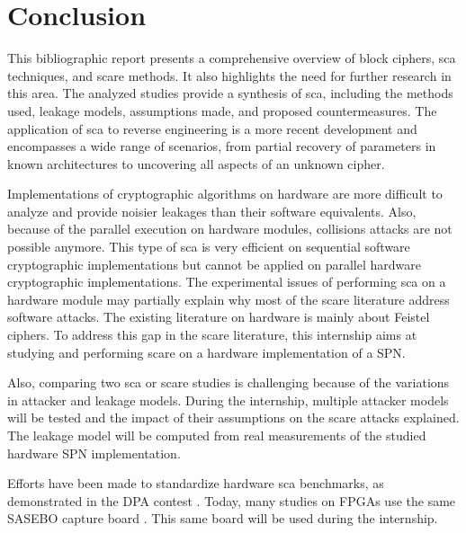 \documentclass[11pt]{sdm}
\begin{document}



\section{Conclusion}

This bibliographic report presents a comprehensive overview of block ciphers, \gls{sca} techniques, and \gls{scare} methods.
It also highlights the need for further research in this area.
The analyzed studies provide a synthesis of \gls{sca}, including the methods used, leakage models, assumptions made, and proposed countermeasures.
The application of \gls{sca} to reverse engineering is a more recent development and encompasses a wide range of scenarios, from partial recovery of parameters in known architectures to uncovering all aspects of an unknown cipher.

Implementations of cryptographic algorithms on hardware are more difficult to analyze and provide noisier leakages than their software equivalents.
Also, because of the parallel execution on hardware modules, collisions attacks are not possible anymore.
This type of \gls{sca} is very efficient on sequential software cryptographic implementations but cannot be applied on parallel hardware cryptographic implementations.
The experimental issues of performing \gls{sca} on a hardware module may partially explain why most of the \gls{scare} literature address software attacks.
The existing literature on hardware is mainly about Feistel ciphers.
To address this gap in the \gls{scare} literature, this internship aims at studying and performing \gls{scare} on a hardware implementation of a SPN.

Also, comparing two \gls{sca} or \gls{scare} studies is challenging because of the variations in attacker and leakage models.
During the internship, multiple attacker models will be tested and the impact of their assumptions on the \gls{scare} attacks explained.
The leakage model will be computed from real measurements of the studied hardware SPN implementation.

Efforts have been made to standardize hardware \gls{sca} benchmarks, as demonstrated in the DPA contest \parencite{Clavier_Danger_Duc_Elaabid_Gérard_Guilley_Heuser_Kasper_Li_Lomné_et_al_2014}.
Today, many studies on FPGAs use the same SASEBO capture board \parencite{Satoh}.
This same board will be used during the internship.
\end{document}
